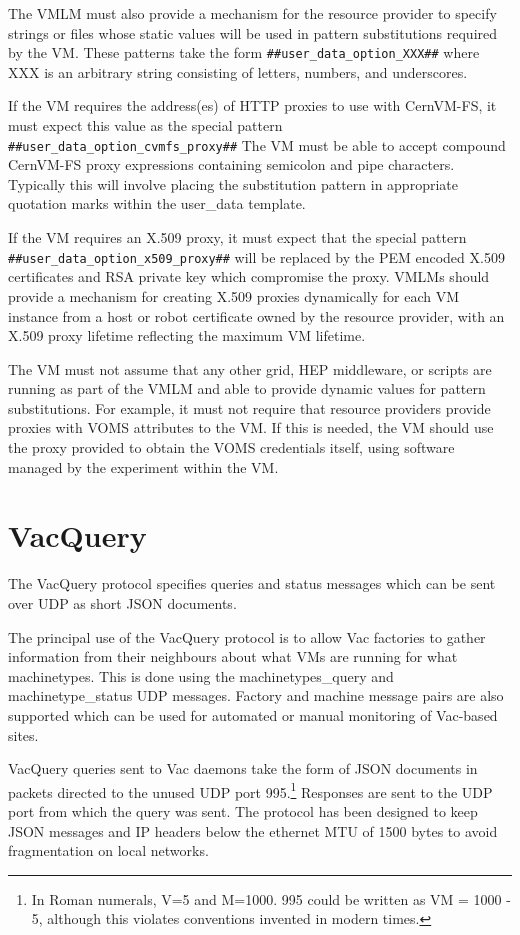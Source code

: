 \documentclass[12pt,a4paper]{article}
\begin{document}
The VMLM must also provide a mechanism for the resource provider
to specify strings or files whose static values will be used in pattern 
substitutions required by the VM. These patterns take the form
\texttt{\#\#user\_data\_option\_XXX\#\#} where XXX is an arbitrary string
consisting of letters, numbers, and underscores. 

If the VM requires the address(es) of HTTP proxies to use with CernVM-FS,
it must expect this value as the special pattern 
\texttt{\#\#user\_data\_option\_cvmfs\_proxy\#\#} The VM must be able to
accept compound CernVM-FS proxy expressions containing semicolon and pipe 
characters. Typically this will involve placing the substitution pattern
in appropriate quotation marks within the user\_data template.

If the VM requires an X.509 proxy, it must expect that the special pattern
\texttt{\#\#user\_data\_option\_x509\_proxy\#\#} will be replaced by the 
PEM encoded X.509 certificates and RSA private key which compromise the
proxy. VMLMs should provide a mechanism for creating X.509 proxies
dynamically for each VM instance from a host or robot certificate owned
by the resource provider, with an X.509 proxy lifetime reflecting
the maximum VM lifetime. 

The VM must not assume that any other grid, HEP middleware, or scripts
are running as part of the VMLM and able to provide dynamic values for
pattern substitutions. For example, it
must not require that resource providers provide proxies with VOMS
attributes to the VM. If this is needed, the VM should use
the proxy provided to obtain the VOMS credentials itself, using software 
managed by the experiment within the VM.

\section{VacQuery}
\label{sec:vacquery}

The VacQuery protocol specifies queries and status messages
which can be sent over UDP as short JSON documents.

The principal use of the VacQuery protocol is to allow Vac factories to
gather information from their neighbours about what VMs are running for
what machinetypes. This is done using the machinetypes\_query and
machinetype\_status UDP messages. Factory and machine message pairs
are also supported which can be used for automated or manual 
monitoring of Vac-based sites.

VacQuery queries sent to Vac daemons take the form of JSON documents
in packets directed to the unused UDP port 
995.\footnote{In Roman numerals, V=5 and M=1000. 995 could be written
as VM = 1000 - 5, although this violates conventions invented in 
modern times.} Responses are sent to the UDP port from which the
query was sent. The protocol has been designed to keep JSON messages and
IP headers below the ethernet MTU of 1500 bytes to avoid fragmentation
on local networks. 
\end{document}
